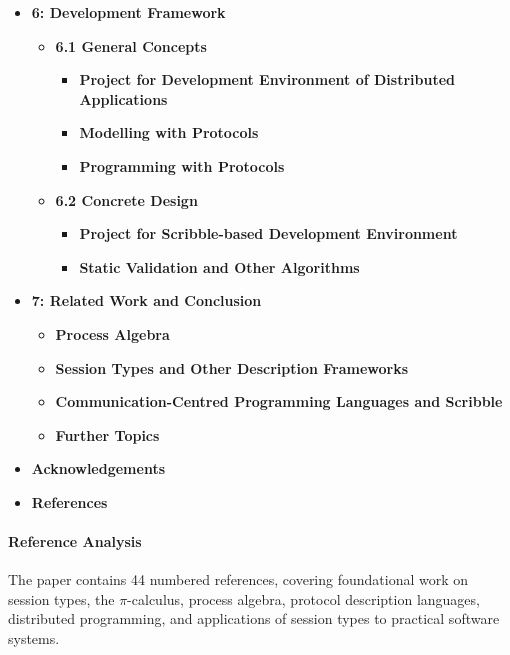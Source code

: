 \begin{itemize}
    \item \textbf{6: Development Framework}
    \begin{itemize}
        \item \textbf{6.1 General Concepts}
        \begin{itemize}
            \item \textbf{Project for Development Environment of Distributed Applications}
            \item \textbf{Modelling with Protocols}
            \item \textbf{Programming with Protocols}
        \end{itemize}

        \item \textbf{6.2 Concrete Design}
        \begin{itemize}
            \item \textbf{Project for Scribble-based Development Environment}
            \item \textbf{Static Validation and Other Algorithms}
        \end{itemize}
    \end{itemize}

    \item \textbf{7: Related Work and Conclusion}
    \begin{itemize}
        \item \textbf{Process Algebra}
        \item \textbf{Session Types and Other Description Frameworks}
        \item \textbf{Communication-Centred Programming Languages and Scribble}
        \item \textbf{Further Topics}
    \end{itemize}

    \item \textbf{Acknowledgements}

    \item \textbf{References}
\end{itemize}

\paragraph{Reference Analysis}
The paper contains 44 numbered references, covering foundational work on session types, the $\pi$-calculus, process algebra, protocol description languages, distributed programming, and applications of session types to practical software systems.

